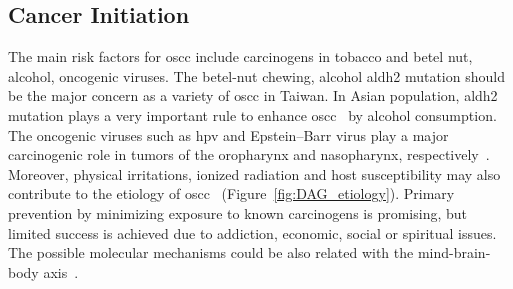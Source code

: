 \documentclass[12pt, a4paper]{article}
\begin{document}









\subsection{Cancer Initiation}
The main risk factors for \acrshort{oscc} include carcinogens in tobacco and betel nut, alcohol, oncogenic viruses.
The betel-nut chewing, alcohol \acrfull{aldh2} mutation should be the major concern as a variety of \acrshort{oscc} in Taiwan.
In Asian population, \acrfull{aldh2} mutation plays a very important rule to enhance \acrshort{oscc}~\citep{Chien2019} by alcohol consumption.
The oncogenic viruses such as \acrfull{hpv} and Epstein–Barr virus play a major carcinogenic role in tumors of the oropharynx and nasopharynx, respectively~\citep{Ferrarotto2017}.
Moreover, physical irritations, ionized radiation and host susceptibility may also contribute to the etiology of \acrshort{oscc}~\citep{Ko1995,Znaori2003} (Figure~\ref{fig:DAG_etiology}).
Primary prevention by minimizing exposure to known carcinogens is promising, but limited success is achieved due to addiction, economic, social or spiritual issues.
The possible molecular mechanisms could be also related with the mind-brain-body axis~\citep{Berens2017}.
\end{document}
